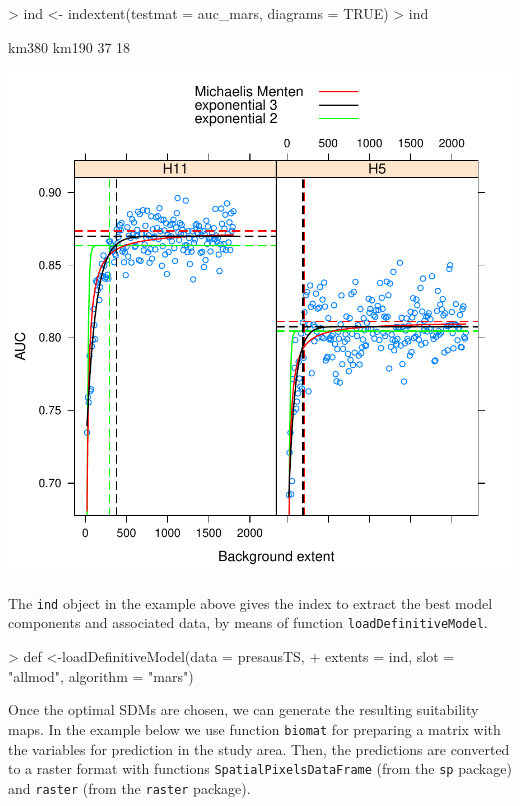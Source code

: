 \documentclass[10pt,a4paper]{article}
\begin{document}
\begin{Schunk}
\begin{Sinput}
> ind <- indextent(testmat = auc_mars, diagrams = TRUE)
> ind
\end{Sinput}
\begin{Soutput}
km380 km190 
   37    18 
\end{Soutput}
\end{Schunk}
\includegraphics{mopa-mopa14}

The \texttt{ind} object in the example above gives the index to extract the best model components and associated data, by means of function \texttt{loadDefinitiveModel}.  

\begin{Schunk}
\begin{Sinput}
> def <-loadDefinitiveModel(data = presausTS, 
+               extents = ind, slot = "allmod", algorithm = "mars")
\end{Sinput}
\end{Schunk}

Once the optimal SDMs are chosen, we can generate the resulting suitability maps. In the example below we use function \texttt{biomat} for preparing a matrix with the variables for prediction in the study area. Then, the predictions are converted to a raster format with functions \texttt{SpatialPixelsDataFrame} (from the \texttt{sp} package) and \texttt{raster} (from the \texttt{raster} package).
\end{document}
